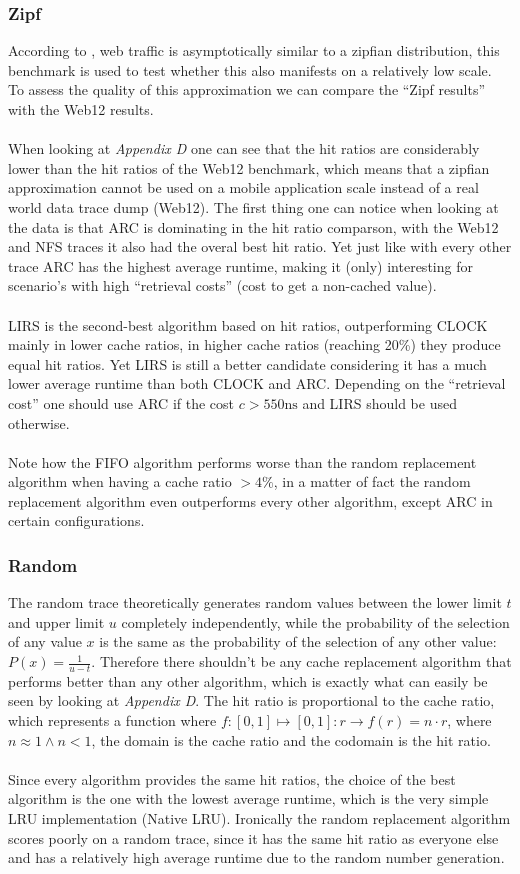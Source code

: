 \documentclass[pdftex,a4paper,12pt,twoside]{report}
\begin{document}
\subsubsection{Zipf}
According to \cite{breslau1999web}, web traffic is asymptotically similar to a zipfian distribution, this benchmark is used to test whether this also manifests on a relatively low scale. To assess the quality of this approximation we can compare the ``Zipf results'' with the Web12 results.
\\\\
When looking at \emph{Appendix D} one can see that the hit ratios are considerably lower than the hit ratios of the Web12 benchmark, which means that a zipfian approximation cannot be used on a mobile application scale instead of a real world data trace dump (Web12). The first thing one can notice when looking at the data is that ARC is dominating in the hit ratio comparson, with the Web12 and NFS traces it also had the overal best hit ratio. Yet just like with every other trace ARC has the highest average runtime, making it (only) interesting for scenario's with high ``retrieval costs'' (cost to get a non-cached value).
\\\\
LIRS is the second-best algorithm based on hit ratios, outperforming CLOCK mainly in lower cache ratios, in higher cache ratios (reaching 20\%) they produce equal hit ratios. Yet LIRS is still a better candidate considering it has a much lower average runtime than both CLOCK and ARC. Depending on the ``retrieval cost'' one should use ARC if the cost $c > 550\text{ns}$ and LIRS should be used otherwise.
\\\\
Note how the FIFO algorithm performs worse than the random replacement algorithm when having a cache ratio $> 4\%$, in a matter of fact the random replacement algorithm even outperforms every other algorithm, except ARC in certain configurations.
\subsubsection{Random}
The random trace theoretically generates random values between the lower limit $t$ and upper limit $u$ completely independently, while the probability of the selection of any value $x$ is the same as the probability of the selection of any other value: $P(x) = \frac{1}{u - t}$. Therefore there shouldn't be any cache replacement algorithm that performs better than any other algorithm, which is exactly what can easily be seen by looking at \emph{Appendix D}. The hit ratio is proportional to the cache ratio, which represents a function where $f : [0,1] \mapsto [0,1] : r \to f(r) = n\cdot r$, where $n \approx 1 \land n < 1$, the domain is the cache ratio and the codomain is the hit ratio.
\\\\
Since every algorithm provides the same hit ratios, the choice of the best algorithm is the one with the lowest average runtime, which is the very simple LRU implementation (Native LRU). Ironically the random replacement algorithm scores poorly on a random trace, since it has the same hit ratio as everyone else and has a relatively high average runtime due to the random number generation.
\end{document}
